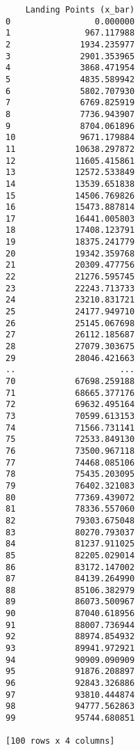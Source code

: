 \documentclass[11pt]{article}
\begin{document}
\begin{verbatim}
    Landing Points (x_bar)  
0                 0.000000  
1               967.117988  
2              1934.235977  
3              2901.353965  
4              3868.471954  
5              4835.589942  
6              5802.707930  
7              6769.825919  
8              7736.943907  
9              8704.061896  
10             9671.179884  
11            10638.297872  
12            11605.415861  
13            12572.533849  
14            13539.651838  
15            14506.769826  
16            15473.887814  
17            16441.005803  
18            17408.123791  
19            18375.241779  
20            19342.359768  
21            20309.477756  
22            21276.595745  
23            22243.713733  
24            23210.831721  
25            24177.949710  
26            25145.067698  
27            26112.185687  
28            27079.303675  
29            28046.421663  
..                     ...  
70            67698.259188  
71            68665.377176  
72            69632.495164  
73            70599.613153  
74            71566.731141  
75            72533.849130  
76            73500.967118  
77            74468.085106  
78            75435.203095  
79            76402.321083  
80            77369.439072  
81            78336.557060  
82            79303.675048  
83            80270.793037  
84            81237.911025  
85            82205.029014  
86            83172.147002  
87            84139.264990  
88            85106.382979  
89            86073.500967  
90            87040.618956  
91            88007.736944  
92            88974.854932  
93            89941.972921  
94            90909.090909  
95            91876.208897  
96            92843.326886  
97            93810.444874  
98            94777.562863  
99            95744.680851  

[100 rows x 4 columns]
    \end{verbatim}

    
    
\end{document}
